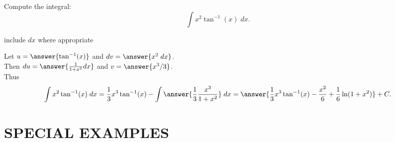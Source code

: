 \documentclass{ximera}
\begin{document}
\begin{problem}
Compute the integral:
  \[
  \int x^2\tan^{-1}(x) \;dx.
  \]
\begin{hint}
      include $dx$ where appropriate
  \end{hint}
  Let $u = \answer{\tan^{-1}(x)}$   and   $dv = \answer{x^2 \;dx}$.\\
  Then $du = \answer{\frac{1}{1+x^2} dx}$   and   $v = \answer{x^3/3}$.\\
  Thus 
  \[
  \int x^2 \tan^{-1}(x) \; dx = \frac13 x^3 \tan^{-1}(x) - \int \answer{\frac13 \frac{x^3}{1+x^2}} \;dx = 
  \answer{\frac13 x^3 \tan^{-1}(x) - \frac{x^2}{6} + \frac16\ln(1+x^2)} + C.
  \]
\end{problem}

\section{SPECIAL EXAMPLES}
\end{document}

